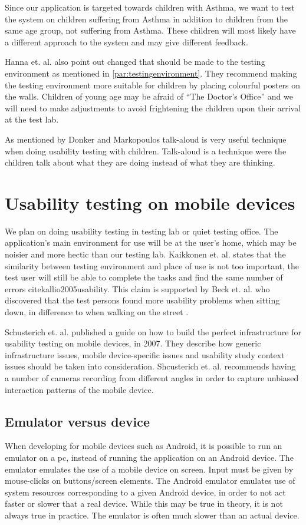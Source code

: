Since our application is targeted towards children with Asthma, we want to test the system on children suffering from Asthma in addition to children from the same age group, not suffering from Asthma. These children will most likely have a different approach to the system and may give different feedback.

Hanna et. al. also point out changed that should be made to the testing environment as mentioned in \ref{par:testingenvironment}. They recommend making the testing environment more suitable for children by placing colourful posters on the walls.
Children of young age may be afraid of ``The Doctor's Office'' and we will need to make adjustments to avoid frightening the children upon their arrival at the test lab. 

As mentioned by Donker and Markopoulos \cite{TalkAloud} talk-aloud is very useful technique when doing usability testing with children. Talk-aloud is a technique were the children talk about what they are doing instead of what they are thinking.


\section{Usability testing on mobile devices}
\label{sec:usabilitytestonmobiledevices}
We plan on doing usability testing in testing lab or quiet testing office. The application's main environment for use will be at the user's home, which may be noisier and more hectic than our testing lab. Kaikkonen et. al. states that the similarity between testing environment and place of use is not too important, the test user will still be able to complete the tasks and find the same number of errors cite{kallio2005usability}. This claim is supported by Beck et. al. who discovered that the test persons found more usability problems when sitting down, in difference to when walking on the street \cite{beck2003experimental}. 

Schusterich et. al. \cite{schusteritsch2007towards} published a guide on how to build the perfect infrastructure for usability testing on mobile devices, in 2007. They describe how generic infrastructure issues, mobile device-specific issues and usability study context issues should be taken into consideration. Shcusterich et. al. recommends having a number of cameras recording from different angles in order to capture unbiased interaction patterns of the mobile device. 

\subsection{Emulator versus device}
When developing for mobile devices such as Android, it is possible to run an emulator on a pc, instead of running the application on an Android device. The emulator emulates the use of a mobile device on screen. Input must be given by mouse-clicks on buttons/screen elements. The Android emulator emulates use of system resources corresponding to a given Android device, in order to not act faster or slower that a real device. While this may be true in theory, it is not always true in practice. The emulator is often much slower than an actual device.


